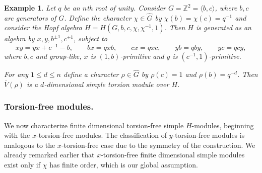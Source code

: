\documentclass[11pt, twoside]{amsart}
\newtheorem{example}[theorem]{Example}
\theoremstyle{definition}
\newcommand{\ZZ}{\mathbb{Z}}
\begin{document}
\begin{example} Let $q$ be an $n$th root of unity. Consider $G=\ZZ^2=\langle b,c\rangle$, where $b,c$ are generators of $G$. Define the character $\chi\in \widehat{G}$ by $\chi(b)=\chi(c)=q^{-1}$ and consider the Hopf algebra $H=H(G,b,c,\chi,\chi^{-1},1)$. Then $H$ is generated as an algebra by $x,y,b^{\pm 1},c^{\pm 1}$, subject to
$$ xy=yx + c^{-1}-b, \qquad bx = qxb, \qquad cx=qxc, \qquad yb=qby, \qquad yc=qcy,$$
where $b,c$ and group-like, $x$ is $(1,b)$-primitive and $y$ is $(c^{-1},1)$-primitive.

For any $1\leq d \leq n$ define a character $\rho \in \widehat{G}$ by $\rho(c)=1$ and $\rho(b)=q^{-d}$. Then $\overline{V}(\rho)$ is a $d$-dimensional simple torsion module over $H$.
\end{example}

\subsubsection*{Torsion-free modules.} We now characterize finite dimensional torsion-free simple $H$-modules, beginning with the $x$-torsion-free modules. The classification of $y$-torsion-free modules is analogous to the $x$-torsion-free case due to the symmetry of the construction. We already remarked earlier that $x$-torsion-free finite dimensional simple modules exist only if $\chi$ has finite order, which is our global assumption.%
\end{document}
